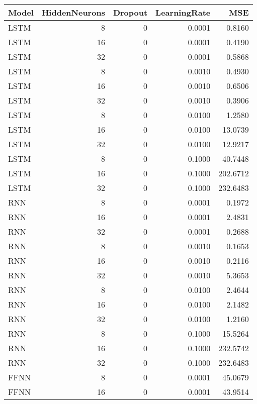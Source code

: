 \begin{table}[h!]
\centering
 \begin{adjustbox}{max width=\textwidth}
\begin{tabular}{lrrrr}
  \hline
Model & HiddenNeurons & Dropout & LearningRate & MSE \\ 
  \hline
LSTM &     8 &     0 & 0.0001 & 0.8160 \\ 
  LSTM &    16 &     0 & 0.0001 & 0.4190 \\ 
  LSTM &    32 &     0 & 0.0001 & 0.5868 \\ 
  LSTM &     8 &     0 & 0.0010 & 0.4930 \\ 
  LSTM &    16 &     0 & 0.0010 & 0.6506 \\ 
  LSTM &    32 &     0 & 0.0010 & 0.3906 \\ 
  LSTM &     8 &     0 & 0.0100 & 1.2580 \\ 
  LSTM &    16 &     0 & 0.0100 & 13.0739 \\ 
  LSTM &    32 &     0 & 0.0100 & 12.9217 \\ 
  LSTM &     8 &     0 & 0.1000 & 40.7448 \\ 
  LSTM &    16 &     0 & 0.1000 & 202.6712 \\ 
  LSTM &    32 &     0 & 0.1000 & 232.6483 \\ 
  RNN &     8 &     0 & 0.0001 & 0.1972 \\ 
  RNN &    16 &     0 & 0.0001 & 2.4831 \\ 
  RNN &    32 &     0 & 0.0001 & 0.2688 \\ 
  RNN &     8 &     0 & 0.0010 & 0.1653 \\ 
  RNN &    16 &     0 & 0.0010 & 0.2116 \\ 
  RNN &    32 &     0 & 0.0010 & 5.3653 \\ 
  RNN &     8 &     0 & 0.0100 & 2.4644 \\ 
  RNN &    16 &     0 & 0.0100 & 2.1482 \\ 
  RNN &    32 &     0 & 0.0100 & 1.2160 \\ 
  RNN &     8 &     0 & 0.1000 & 15.5264 \\ 
  RNN &    16 &     0 & 0.1000 & 232.5742 \\ 
  RNN &    32 &     0 & 0.1000 & 232.6483 \\ 
  FFNN &     8 &     0 & 0.0001 & 45.0679 \\ 
  FFNN &    16 &     0 & 0.0001 & 43.9514 \\ 

\end{tabular}
\end{adjustbox}
\end{table}
